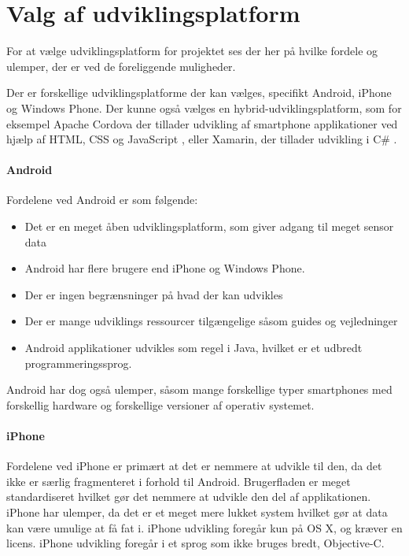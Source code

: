 \section{Valg af udviklingsplatform}\label{sec:valg_af_android}
For at vælge udviklingsplatform for projektet ses der her på hvilke fordele og ulemper, der er ved de foreliggende muligheder.

Der er forskellige udviklingsplatforme der kan vælges, specifikt Android, iPhone og Windows Phone.
Der kunne også vælges en hybrid-udviklingsplatform, som for eksempel Apache Cordova der tillader udvikling af smartphone applikationer ved hjælp af HTML, CSS og JavaScript \citep{misc:apachecordova}, eller Xamarin, der tillader udvikling i C\# \citep{misc:xamarin}.

\paragraph{Android}
Fordelene ved Android er som følgende:
\begin{itemize}
\item Det er en meget åben udviklingsplatform, som giver adgang til meget sensor data
\item Android har flere brugere end iPhone og Windows Phone.
\item Der er ingen begrænsninger på hvad der kan udvikles
\item Der er mange udviklings ressourcer tilgængelige såsom guides og vejledninger
\item Android applikationer udvikles som regel i Java, hvilket er et udbredt programmeringssprog.
\end{itemize}

Android har dog også ulemper, såsom mange forskellige typer smartphones med forskellig hardware og forskellige versioner af operativ systemet.

\paragraph{iPhone}
Fordelene ved iPhone er primært at det er nemmere at udvikle til den, da det ikke er særlig fragmenteret i forhold til Android. 
Brugerfladen er meget standardiseret hvilket gør det nemmere at udvikle den del af applikationen. 
iPhone har ulemper, da det er et meget mere lukket system hvilket gør at data kan være umulige at få fat i. iPhone udvikling foregår kun på OS X, og kræver en licens. iPhone udvikling foregår i et sprog som ikke bruges bredt, Objective-C.

